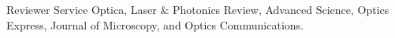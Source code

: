\begin{rubric}{Reviewer Service}
    \entry* Optica, Laser $\&$ Photonics Review, Advanced Science, Optics Express, Journal of Microscopy, and Optics Communications.
\end{rubric}
